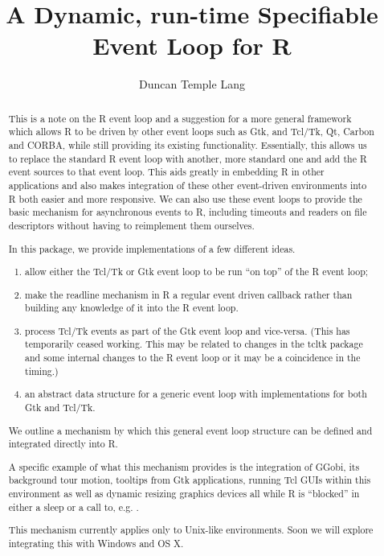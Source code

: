 \documentclass{article}
\author{Duncan Temple Lang}
\title{A Dynamic, run-time Specifiable Event Loop for R}
\begin{document}
\maketitle
\begin{abstract}

  This is a note on the R event loop and a suggestion for a more
  general framework which allows R to be driven by other event loops
  such as Gtk, and Tcl/Tk, Qt, Carbon and CORBA, while still providing
  its existing functionality.  Essentially, this allows us to replace
  the standard R event loop with another, more standard one and add
  the R event sources to that event loop.  This aids greatly in
  embedding R in other applications and also makes integration of
  these other event-driven environments into R both easier and more
  responsive.  We can also use these event loops to provide the basic
  mechanism for asynchronous events to R, including timeouts and
  readers on file descriptors without having to reimplement them
  ourselves.

  In this package, we provide implementations of 
  a few different ideas.
  \begin{enumerate}
  \item allow either the Tcl/Tk or Gtk event loop to be 
  run ``on top'' of the R event loop;
  \item   make the readline mechanism in R
  a regular event driven callback rather than building any knowledge
  of it into the R event loop.
  \item process Tcl/Tk events as part of the Gtk event loop
   and vice-versa. (This has temporarily ceased working. This may be
   related to changes in the tcltk package and some internal changes
   to the R event loop or it may be a coincidence in the timing.)
  \item   an abstract data structure for a generic event
    loop with implementations for both Gtk and Tcl/Tk.
  \end{enumerate}
 

  We outline a mechanism by which this general
  event loop structure can be defined and integrated directly into R.

  A specific example of what this mechanism provides is the
  integration of GGobi, its background tour motion, tooltips from Gtk
  applications, running Tcl GUIs within this environment as well as
  dynamic resizing graphics devices all while R is ``blocked'' in
  either a sleep or a call to, e.g. .
  
  This mechanism currently applies only to Unix-like environments.
  Soon we will explore integrating this with Windows and OS X.

\end{abstract}
\end{document}
